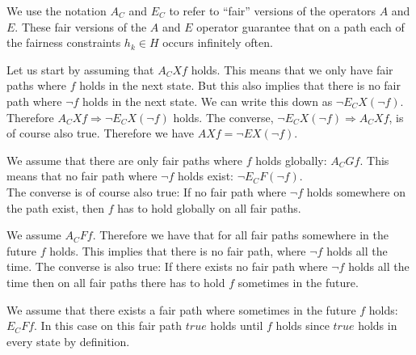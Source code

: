 \documentclass[a4paper, 12pt]{article}
\begin{document}
We use the notation $A_C$ and $E_C$ to refer to “fair” versions of the operators $A$ and $E$. These fair versions of the $A$ and $E$ operator guarantee that on a path each of the fairness constraints $h_k ∈ H$ occurs infinitely often.

\begin{description}[style=multiline, leftmargin=3.8cm]

    \item[$A_C X f = ¬E_CX(¬f)$] Let us start by assuming that $A_C X f$ holds. This means that we only have fair paths where $f$ holds in the next state. But this also implies that there is no fair path where $¬f$ holds in the next state. We can write this down as $¬E_CX(¬f)$. Therefore $A_C X f ⇒ ¬E_CX(¬f)$ holds. The converse, $¬E_CX(¬f) ⇒ A_C X f$, is of course also true. Therefore we have $AX f = ¬EX(¬f)$.

    \item[$A_C Gf = ¬E_C F(¬f)$] We assume that there are only fair paths where $f$ holds globally: $A_C Gf$. This means that no fair path where $¬ f$ holds exist: $¬E_C F(¬f)$.\\

    The converse is of course also true: If no fair path where $¬f$ holds somewhere on the path exist, then $f$ has to hold globally on all fair paths.

    \item[$A_C Ff = ¬E_C G(¬f)$] We assume $A_C Ff$. Therefore we have that for all fair paths somewhere in the future $f$ holds. This implies that there is no fair path, where $¬f$ holds all the time. The converse is also true: If there exists no fair path where $¬f$ holds all the time then on all fair paths there has to hold $f$ sometimes in the future.

    \item[$E_C Ff = E(true~U~f)$] We assume that there exists a fair path  where sometimes in the future $f$ holds: $E_C Ff$. In this case on this fair path $true$ holds until $f$ holds since $true$ holds in every state by definition.

\end{description}



\end{document}

